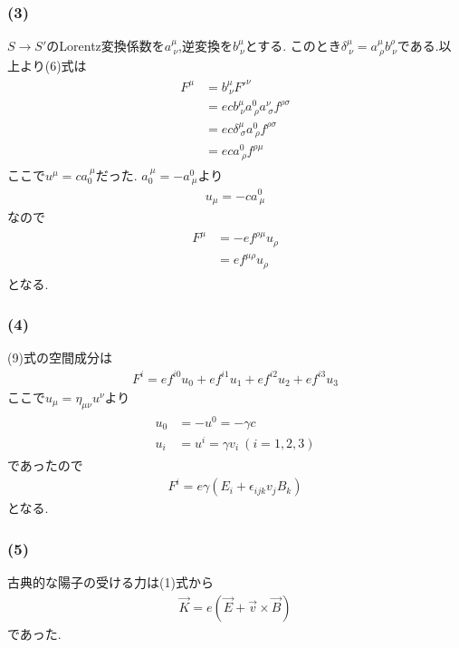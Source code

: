 \documentclass[uplatex,a4j,11pt,dvipdfmx]{jsarticle}
\begin{document}
\subsubsection*{(3)}
$S\rightarrow S'$のLorentz変換係数を$a^\mu_{\ \nu}$,逆変換を$b^\mu_{\ \nu}$とする.
このとき$\delta^\mu_{\ \nu}=a^\mu_{\ \rho}b^{\rho}_{\ \nu}$である.以上より(6)式は
\begin{align}
  \begin{split}
    F^\mu&=b^\mu_{\ \nu}F'^{\nu}\\
    &=ecb^\mu_{\ \nu}a^0_{\ \rho}a^\nu_{\ \sigma}f^{\rho\sigma}\\
    &=ec\delta^\mu_{\ \sigma}a^0_{\ \rho}f^{\rho\sigma}\\
    &=eca^0_{\ \rho}f^{\rho\mu}
  \end{split}
\end{align}
ここで$u^\mu=ca_0^{\ \mu}$だった.
$a_0^{\ \mu}=-a^0_{\ \mu}$より
\begin{align}
  u_\mu=-ca^0_{\ \mu}
\end{align}
なので
\begin{align}
  \begin{split}
    F^\mu&=-ef^{\rho\mu}u_\rho\\
    &=ef^{\mu\rho}u_\rho
  \end{split}
\end{align}
となる.
\subsubsection*{(4)}
(9)式の空間成分は
\begin{align}
  F^i=ef^{i0}u_0+ef^{i1}u_1+ef^{i2}u_2+ef^{i3}u_3
\end{align}
ここで$u_\mu=\eta_{\mu\nu}u^\nu$より
\begin{align}
  \begin{split}
    u_0&=-u^0=-\gamma c\\
    u_i&=u^i=\gamma v_i\ (i=1,2,3)
  \end{split}
\end{align}
であったので
\begin{align}
  F^i=e\gamma(E_i+\epsilon_{ijk}v_jB_k)
\end{align}
となる.
\subsubsection*{(5)}
古典的な陽子の受ける力は(1)式から
\begin{align}
  \vec{K}=e(\vec{E}+\vec{v}\times\vec{B})
\end{align}
であった.
\end{document}
